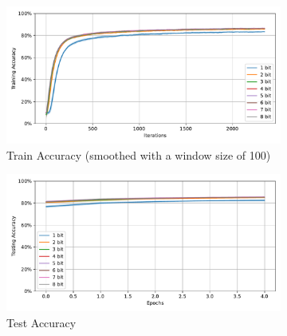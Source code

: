         \begin{figure}[H]
            \centering
            \begin{subfigure}[H]{0.65\textwidth}
                \centering
                \includegraphics[width=\textwidth]{../standard/FashionMNIST/plots/fashionmnist_train_acc.pdf}
                \caption{Train Accuracy (smoothed with a window size of 100)}
            \end{subfigure}
            \hfill
            \begin{subfigure}[H]{0.65\textwidth}
                \centering
                \includegraphics[width=\textwidth]{../standard/FashionMNIST/plots/fashionmnist_test_acc.pdf}
                \caption{Test Accuracy}
            \end{subfigure}
            \hfill
            \begin{subfigure}[H]{0.3\textwidth}
                \centering

\end{subfigure}
\end{figure}
